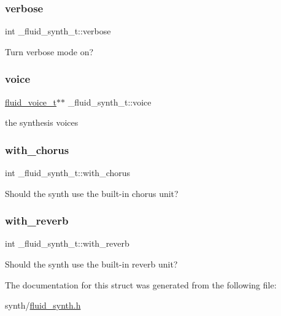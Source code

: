 \subsubsection{\texorpdfstring{verbose}{verbose}}
{\footnotesize\ttfamily int \+\_\+fluid\+\_\+synth\+\_\+t\+::verbose}

Turn verbose mode on? \mbox{\label{struct__fluid__synth__t_abafa4495b1eee10130c3359934b446f9}} 
\subsubsection{\texorpdfstring{voice}{voice}}
{\footnotesize\ttfamily \hyperlink{types_8h_a5123ae5ef2d7806475267380c33604c3}{fluid\+\_\+voice\+\_\+t}$\ast$$\ast$ \+\_\+fluid\+\_\+synth\+\_\+t\+::voice}

the synthesis voices \mbox{\label{struct__fluid__synth__t_aa60eed2e27ed835cc776689510a43573}} 
\subsubsection{\texorpdfstring{with\+\_\+chorus}{with\_chorus}}
{\footnotesize\ttfamily int \+\_\+fluid\+\_\+synth\+\_\+t\+::with\+\_\+chorus}

Should the synth use the built-\/in chorus unit? \mbox{\label{struct__fluid__synth__t_ae65cd480d1e7273f7f3b9bb242353210}} 
\subsubsection{\texorpdfstring{with\+\_\+reverb}{with\_reverb}}
{\footnotesize\ttfamily int \+\_\+fluid\+\_\+synth\+\_\+t\+::with\+\_\+reverb}

Should the synth use the built-\/in reverb unit? 

The documentation for this struct was generated from the following file\+:\begin{DoxyCompactItemize}
\item 
synth/\hyperlink{fluid__synth_8h}{fluid\+\_\+synth.\+h}\end{DoxyCompactItemize}
